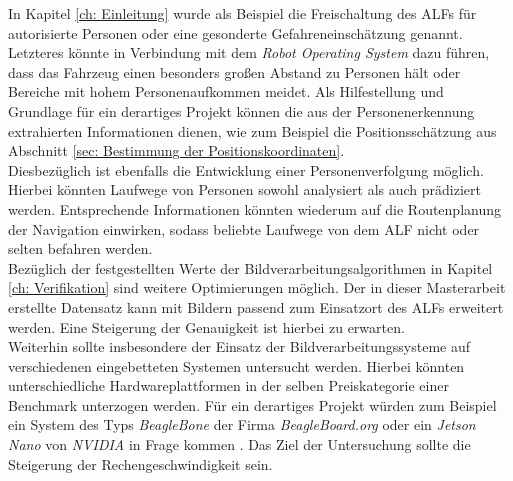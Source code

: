 In Kapitel \ref{ch: Einleitung} wurde als Beispiel die Freischaltung des ALFs für autorisierte Personen oder eine gesonderte Gefahreneinschätzung genannt. Letzteres könnte in Verbindung mit dem \textit{Robot Operating System} dazu führen, dass das Fahrzeug einen besonders großen Abstand zu Personen hält oder Bereiche mit hohem Personenaufkommen meidet. Als Hilfestellung und Grundlage für ein derartiges Projekt können die aus der Personenerkennung extrahierten Informationen dienen, wie zum Beispiel die Positionsschätzung aus Abschnitt \ref{sec: Bestimmung der Positionskoordinaten}. \\

Diesbezüglich ist ebenfalls die Entwicklung einer Personenverfolgung möglich. Hierbei könnten Laufwege von Personen sowohl analysiert als auch prädiziert werden. Entsprechende Informationen könnten wiederum auf die Routenplanung der Navigation einwirken, sodass beliebte Laufwege von dem ALF nicht oder selten befahren werden. \\

Bezüglich der festgestellten Werte der Bildverarbeitungsalgorithmen in Kapitel \ref{ch: Verifikation} sind weitere Optimierungen möglich. Der in dieser Masterarbeit erstellte Datensatz kann mit Bildern passend zum Einsatzort des ALFs erweitert werden. Eine Steigerung der Genauigkeit ist hierbei zu erwarten.\\

Weiterhin sollte insbesondere der Einsatz der Bildverarbeitungssysteme auf verschiedenen eingebetteten Systemen untersucht werden. Hierbei könnten unterschiedliche Hardwareplattformen in der selben Preiskategorie einer Benchmark unterzogen werden. Für ein derartiges Projekt würden zum Beispiel ein System des Typs \textit{BeagleBone} der Firma \textit{BeagleBoard.org} oder ein \textit{Jetson Nano} von \textit{NVIDIA} in Frage kommen \cite{beagle, jetson}. Das Ziel der Untersuchung sollte die Steigerung der Rechengeschwindigkeit sein. 





